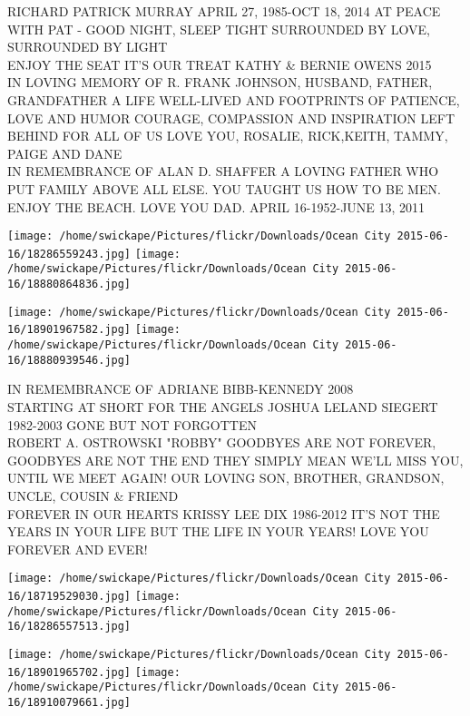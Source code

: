 \documentclass[10pt,letterpaper]{article}
\begin{document}
RICHARD PATRICK MURRAY APRIL 27, 1985{-}OCT 18, 2014 AT PEACE WITH PAT {-} GOOD NIGHT, SLEEP TIGHT SURROUNDED BY LOVE, SURROUNDED BY LIGHT\\
ENJOY THE SEAT IT'S OUR TREAT KATHY \& BERNIE OWENS 2015\\
IN LOVING MEMORY OF R. FRANK JOHNSON, HUSBAND, FATHER, GRANDFATHER A LIFE WELL{-}LIVED AND FOOTPRINTS OF PATIENCE, LOVE AND HUMOR COURAGE, COMPASSION AND INSPIRATION LEFT BEHIND FOR ALL OF US LOVE YOU, ROSALIE, RICK,KEITH, TAMMY, PAIGE AND DANE\\
IN REMEMBRANCE OF ALAN D. SHAFFER A LOVING FATHER WHO PUT FAMILY ABOVE ALL ELSE.  YOU TAUGHT US HOW TO BE MEN. ENJOY THE BEACH.  LOVE YOU DAD. APRIL 16{-}1952{-}JUNE 13, 2011\\
\pagebreak

\texttt{[image: /home/swickape/Pictures/flickr/Downloads/Ocean City 2015-06-16/18286559243.jpg]}
\texttt{[image: /home/swickape/Pictures/flickr/Downloads/Ocean City 2015-06-16/18880864836.jpg]}

\texttt{[image: /home/swickape/Pictures/flickr/Downloads/Ocean City 2015-06-16/18901967582.jpg]}
\texttt{[image: /home/swickape/Pictures/flickr/Downloads/Ocean City 2015-06-16/18880939546.jpg]}

IN REMEMBRANCE OF ADRIANE BIBB{-}KENNEDY 2008\\
STARTING AT SHORT FOR THE ANGELS JOSHUA LELAND SIEGERT 1982{-}2003 GONE BUT NOT FORGOTTEN\\
ROBERT A. OSTROWSKI "ROBBY" GOODBYES ARE NOT FOREVER, GOODBYES ARE NOT THE END THEY SIMPLY MEAN WE'LL MISS YOU, UNTIL WE MEET AGAIN!  OUR LOVING SON, BROTHER, GRANDSON, UNCLE, COUSIN \& FRIEND\\
FOREVER IN OUR HEARTS KRISSY LEE DIX 1986{-}2012 IT'S NOT THE YEARS IN YOUR LIFE BUT THE LIFE IN YOUR YEARS!  LOVE YOU FOREVER AND EVER!\\
\pagebreak

\texttt{[image: /home/swickape/Pictures/flickr/Downloads/Ocean City 2015-06-16/18719529030.jpg]}
\texttt{[image: /home/swickape/Pictures/flickr/Downloads/Ocean City 2015-06-16/18286557513.jpg]}

\texttt{[image: /home/swickape/Pictures/flickr/Downloads/Ocean City 2015-06-16/18901965702.jpg]}
\texttt{[image: /home/swickape/Pictures/flickr/Downloads/Ocean City 2015-06-16/18910079661.jpg]}
\end{document}
